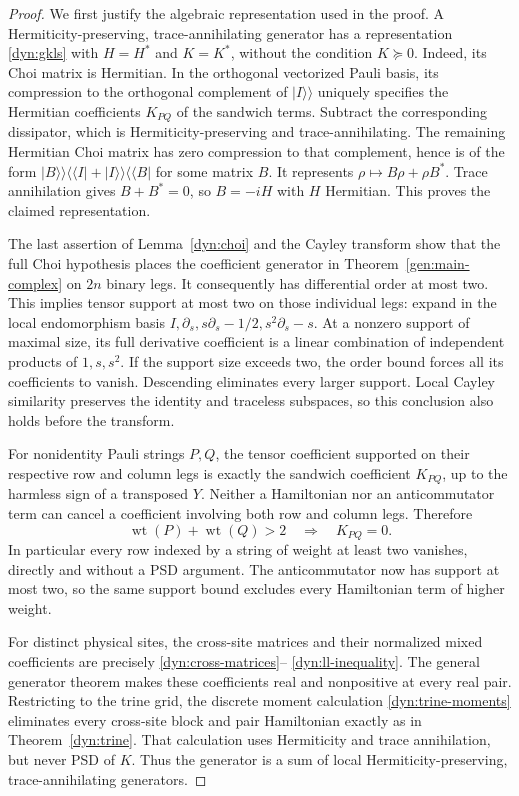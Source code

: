 \documentclass[reqno]{amsart}
\theoremstyle{definition}
\theoremstyle{remark}
\begin{document}
\begin{proof}
We first justify the algebraic representation used in the proof.
A Hermiticity-preserving, trace-annihilating generator has a representation
\eqref{dyn:gkls} with $H=H^*$ and $K=K^*$, without the condition
$K\succeq0$.  Indeed, its Choi matrix is Hermitian.  In the orthogonal
vectorized Pauli basis, its compression to the orthogonal complement
of $|I\rangle\!\rangle$ uniquely specifies the Hermitian coefficients
$K_{PQ}$ of the sandwich terms.  Subtract the corresponding dissipator,
which is Hermiticity-preserving and trace-annihilating.  The remaining
Hermitian Choi matrix has zero compression to that complement, hence
is of the form
$|B\rangle\!\rangle\langle\!\langle I|
 +|I\rangle\!\rangle\langle\!\langle B|$ for some matrix $B$.
It represents $\rho\mapsto B\rho+\rho B^*$.
Trace annihilation gives $B+B^*=0$, so $B=-iH$ with $H$ Hermitian.
This proves the claimed representation.

The last assertion of Lemma~\ref{dyn:choi} and the Cayley transform show
that the full Choi hypothesis places the coefficient generator in
Theorem~\ref{gen:main-complex} on $2n$ binary legs.
It consequently has differential order at most two.
This implies tensor support at most two on those individual legs:
expand in the local endomorphism basis
$I,\partial_s,s\partial_s-1/2,s^2\partial_s-s$.
At a nonzero support of maximal size, its full derivative coefficient
is a linear combination of independent products of $1,s,s^2$.
If the support size exceeds two, the order bound forces all its
coefficients to vanish.  Descending eliminates every larger support.
Local Cayley similarity preserves the identity and traceless
subspaces, so this conclusion also holds before the transform.

For nonidentity Pauli strings $P,Q$, the tensor coefficient supported
on their respective row and column legs is exactly the sandwich
coefficient $K_{PQ}$, up to the harmless sign of a transposed $Y$.
Neither a Hamiltonian nor an anticommutator term can cancel a
coefficient involving both row and column legs.  Therefore
\[
 \operatorname{wt}(P)+\operatorname{wt}(Q)>2
 \quad\Longrightarrow\quad K_{PQ}=0.
\]
In particular every row indexed by a string of weight at least two
vanishes, directly and without a PSD argument.  The anticommutator
now has support at most two, so the same support bound excludes every
Hamiltonian term of higher weight.

For distinct physical sites, the cross-site matrices and their normalized
mixed coefficients are precisely \eqref{dyn:cross-matrices}--
\eqref{dyn:ll-inequality}.  The general generator theorem makes these
coefficients real and nonpositive at every real pair.  Restricting to
the trine grid, the discrete moment calculation
\eqref{dyn:trine-moments} eliminates every cross-site block and pair
Hamiltonian exactly as in Theorem~\ref{dyn:trine}.  That calculation
uses Hermiticity and trace annihilation, but never PSD of $K$.
Thus the generator is a sum of local Hermiticity-preserving,
trace-annihilating generators.


\end{proof}
\end{document}
